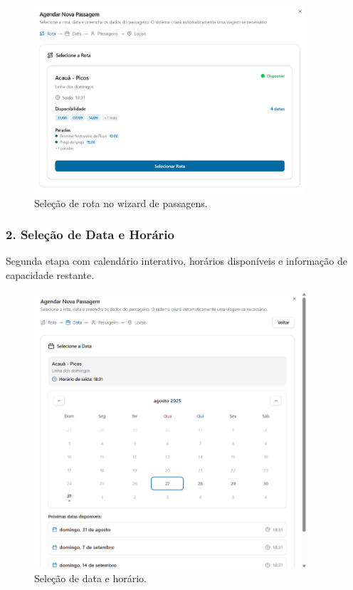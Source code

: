 \begin{figure}[H]
  \centering
  \includegraphics[width=0.9\textwidth]{imagens/wizard-rota.png}
  \caption{Seleção de rota no wizard de passagens.}
  \label{fig:wizard-rota}
\end{figure}

\subsubsection{2. Seleção de Data e Horário}

Segunda etapa com calendário interativo, horários disponíveis e informação de capacidade restante.

\begin{figure}[H]
  \centering
  \includegraphics[width=0.9\textwidth]{imagens/wizard-data.png}
  \caption{Seleção de data e horário.}
  \label{fig:wizard-data}
\end{figure}

